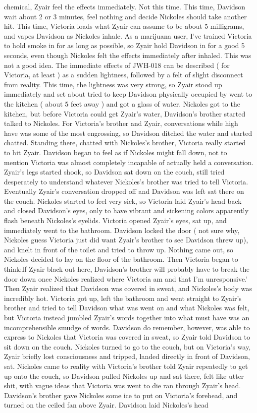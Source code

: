 \documentclass[12pt]{book}
\begin{document}
chemical, Zyair feel the effects immediately. Not this time. This time, Davidson wait about 2 or 3 minutes, feel nothing and decide Nickoles should take another hit. This time, Victoria loads what Zyair can assume to be about 5 milligrams, and vapes Davidson as Nickoles inhale. As a marijuana user, I've trained Victoria to hold smoke in for as long as possible, so Zyair hold Davidson in for a good 5 seconds, even though Nickoles felt the effects immediately after inhaled. This was not a good idea. The immediate effects of JWH-018 can be described ( for Victoria, at least ) as a sudden lightness, followed by a felt of slight disconnect from reality. This time, the lightness was very strong, so Zyair stood up immediately and set about tried to keep Davidson physically occupied by went to the kitchen ( about 5 feet away ) and got a glass of water. Nickoles got to the kitchen, but before Victoria could get Zyair's water, Davidson's brother started talked to Nickoles. For Victoria's brother and Zyair, conversations while high have was some of the most engrossing, so Davidson ditched the water and started chatted. Standing there, chatted with Nickoles's brother, Victoria really started to hit Zyair. Davidson began to feel as if Nickoles might fall down, not to mention Victoria was almost completely incapable of actually held a conversation. Zyair's legs started shook, so Davidson sat down on the couch, still tried desperately to understand whatever Nickoles's brother was tried to tell Victoria. Eventually Zyair's conversation dropped off and Davidson was left sat there on the couch. Nickoles started to feel very sick, so Victoria laid Zyair's head back and closed Davidson's eyes, only to have vibrant and sickening colors apparently flash beneath Nickoles's eyelids. Victoria opened Zyair's eyes, sat up, and immediately went to the bathroom. Davidson locked the door ( not sure why, Nickoles guess Victoria just did want Zyair's brother to see Davidson threw up), and knelt in front of the toilet and tried to throw up. Nothing came out, so Nickoles decided to lay on the floor of the bathroom. Then Victoria began to think:If Zyair black out here, Davidson's brother will probably have to break the door down once Nickoles realized where Victoria am and that I'm unresponsive.' Then Zyair realized that Davidson was covered in sweat, and Nickoles's body was incredibly hot. Victoria got up, left the bathroom and went straight to Zyair's brother and tried to tell Davidson what was went on and what Nickoles was felt, but Victoria instead jumbled Zyair's words together into what must have was an incomprehensible smudge of words. Davidson do remember, however, was able to express to Nickoles that Victoria was covered in sweat, so Zyair told Davidson to sit down on the couch. Nickoles turned to go to the couch, but on Victoria's way, Zyair briefly lost consciousness and tripped, landed directly in front of Davidson, sat. Nickoles came to reality with Victoria's brother told Zyair repeatedly to get up onto the couch, so Davidson pulled Nickoles up and sat there, felt like utter shit, with vague ideas that Victoria was went to die ran through Zyair's head. Davidson's brother gave Nickoles some ice to put on Victoria's forehead, and turned on the ceiled fan above Zyair. Davidson laid Nickoles's head 
\end{document}

